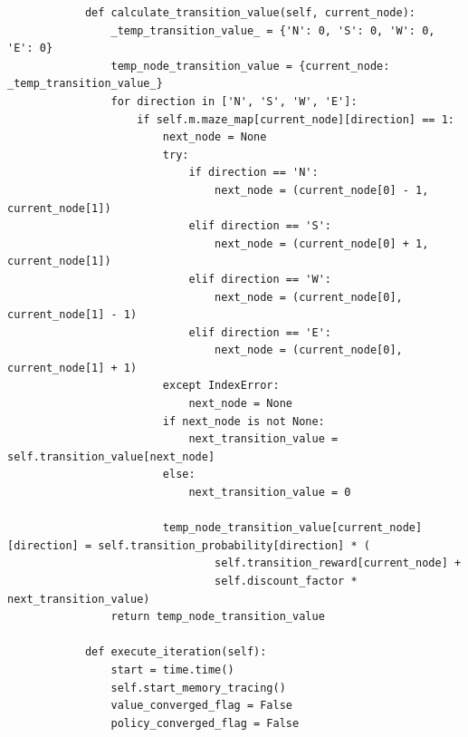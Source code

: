 \documentclass{article}
\begin{document}
\begin{lstlisting}
            def calculate_transition_value(self, current_node):
                _temp_transition_value_ = {'N': 0, 'S': 0, 'W': 0, 'E': 0}
                temp_node_transition_value = {current_node: _temp_transition_value_}
                for direction in ['N', 'S', 'W', 'E']:
                    if self.m.maze_map[current_node][direction] == 1:
                        next_node = None
                        try:
                            if direction == 'N':
                                next_node = (current_node[0] - 1, current_node[1])
                            elif direction == 'S':
                                next_node = (current_node[0] + 1, current_node[1])
                            elif direction == 'W':
                                next_node = (current_node[0], current_node[1] - 1)
                            elif direction == 'E':
                                next_node = (current_node[0], current_node[1] + 1)
                        except IndexError:
                            next_node = None
                        if next_node is not None:
                            next_transition_value = self.transition_value[next_node]
                        else:
                            next_transition_value = 0
        
                        temp_node_transition_value[current_node][direction] = self.transition_probability[direction] * (
                                self.transition_reward[current_node] +
                                self.discount_factor * next_transition_value)
                return temp_node_transition_value
        
            def execute_iteration(self):
                start = time.time()
                self.start_memory_tracing()
                value_converged_flag = False
                policy_converged_flag = False
        

\end{lstlisting}
\end{document}
